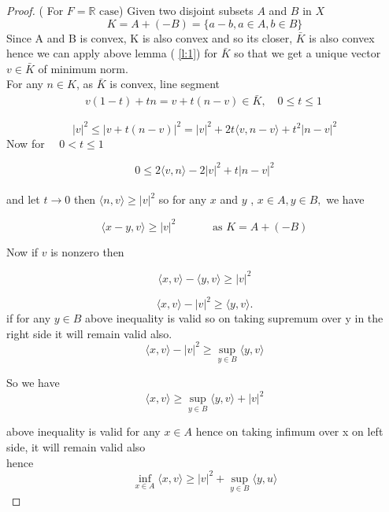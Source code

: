 \documentclass[oneside]{book}
\begin{document}
	
	
	
	
	\begin{proof}( For $ F=\mathbb{R} \text{ case}$)
		Given two disjoint subsets $A$ and $B$ in $X$
		\\
		$$K = A +(-B) = \{ a - b ,a \in A,b \in B\} $$
		Since A and B is convex,  K is also convex and so its closer, $ \bar{K}$ is also convex hence we can apply above lemma ( \ref{l:1}) for $\bar{K}$ so that we get a unique vector $v \in \bar{K}$ of minimum norm. \\
		For any $ n \in K$, as $\bar{K}$ is convex, line segment 
		$$\begin{aligned} v(1-t)+t n=v+t(n-v) \in \bar{K}  , \quad 0 \leq t \leq 1 
		\end{aligned}\ 
		$$
		
		
	
		
		
		$$ |v|^{2} \leq|v+t(n-v)|^{2}=|v|^{2}+2 t\langle v, n-v\rangle +t^{2}|n-v|^{2}$$
	Now for $ \quad 0 < t \leq 1$	
	
	$$ 0 \leq 2\langle v, n\rangle-2|v|^{2}+t|n-v|^{2}$$
		\\
		
		and let $t \rightarrow 0$
		then
		$\langle n, v\rangle \geq|v|^{2}$
		so for any $x$ and $y$ , $ x \in A, y \in B,$
		we have 
		
		$$\langle x-y,v \rangle \geq |v|^{2}
		\quad \quad \quad \text{ as } K = A + (-B)$$
		
		Now if $v$ is nonzero then 
		
		$$\langle x, v\rangle-\langle y, v\rangle \geqslant|v|^{2}$$
		
		$$\langle x, v\rangle-|v|^{2} \geqslant\langle y, v\rangle.$$
		if for any $y \in B $
		above inequality is valid so on taking supremum over y in the right side it will remain valid also.
		$$\langle x, v\rangle-|v|^{2} \geqslant \sup_{y \in B}\langle y, v\rangle$$
		
		So we have
		$$
		\langle x, v \rangle \geqslant\sup_{y\in B}\langle y, v\rangle+|v|^{2}
		$$
		
		
		above inequality  is valid for any $x \in A$  hence on taking infimum over x on left side, it will remain valid also \\
		hence
		\begin{equation}
		\label{eq4.1}
		\inf _{x \in A}\langle x, v \rangle \geqslant|v|^{2}+\sup _{y \in B}\langle y, u\rangle
		\end{equation}
		

\end{proof}
\end{document}
